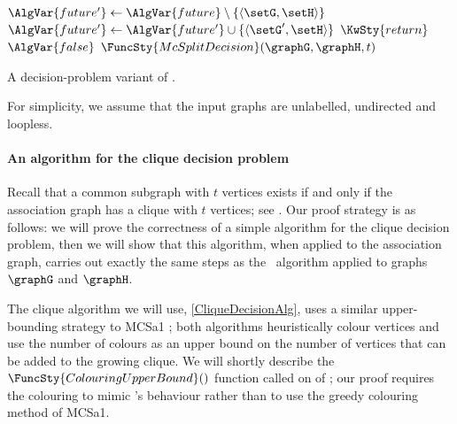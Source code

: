 \begin{algorithm}[htb]
{\nl $\AlgVar{future'} \gets \AlgVar{future} \setminus \{\langle \setG,\setH \rangle\}$\;
\nl {} {$\AlgVar{future'} \gets \AlgVar{future'} \cup \{\langle \setG',\setH \rangle \}$}
\nl {}
    \nl  $\KwSty{return}$ $\AlgVar{false}$ \;
}
\;
\nl $\FuncSty{McSplitDecision}(\graphG,\graphH, t)$ \label{DecisionMcSplitFun} \;
\nl {}
\caption{A decision-problem variant of \McSplit.}
\label{DecisionMcSplitAlg}
\end{algorithm}

For simplicity, we assume that the input graphs are unlabelled,
undirected and loopless.

\paragraph{An algorithm for the clique decision problem} Recall
that a common subgraph with $t$ vertices exists if and only if the
association graph has a clique with $t$ vertices; see
.  Our proof strategy is as follows:
we will prove the correctness of
a simple algorithm for the clique decision problem, then we will show that this
algorithm, when applied to the association graph, carries out exactly the same
steps as the \McSplit\ algorithm applied to graphs $\graphG$ and $\graphH$.

The clique algorithm we will use, \cref{CliqueDecisionAlg},
uses a similar upper-bounding strategy to MCSa1
\citep{DBLP:journals/algorithms/Prosser12,DBLP:journals/ieicet/TomitaSHW13,DBLP:conf/cp/McCreeshNPS16};
both algorithms heuristically colour vertices and use the number of colours
as an upper bound on the number of vertices that can be added to the growing clique.
We will shortly describe the $\FuncSty{ColouringUpperBound}()$ function called
on  of ;
our proof requires the colouring to mimic \McSplit's behaviour rather than
to use the greedy colouring method of MCSa1.

